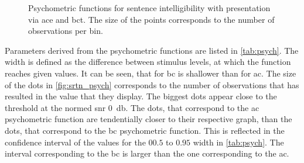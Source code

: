\begin{figure}[H] 
\centering

\caption{Psychometric functions for sentence intelligibility with presentation via \gls{ace} and \gls{bct}. The size of the points corresponds to the number of observations per bin.}
\label{fig:srtn_psych}
\end{figure}




Parameters derived from the psychometric functions are listed in \autoref{tab:psych}. The width is defined  as the difference between stimulus levels, at which the function reaches given values. 
It can be seen, that for \gls{bc} is shallower than for \gls{ac}.
The size of the dots in \autoref{fig:srtn_psych} corresponds to the number of observations that has resulted in the value that they display. The biggest dots appear close to the threshold at the normed \gls{snr} \SI{0}{\decibel}.
The dots, that correspond to the \gls{ac} psychometric function are tendentially closer to their respective graph, than the dots, that correspond to the \gls{bc} psychometric function.
This is reflected in the confidence interval of the values for the $00.5$ to $0.95$ width in \autoref{tab:psych}. The interval corresponding to the \gls{bc} is larger than the one corresponding to the \gls{ac}.



